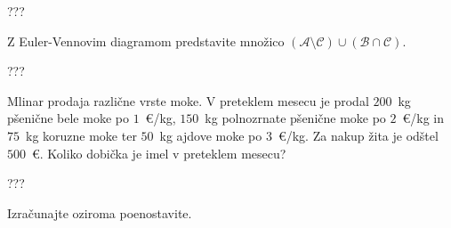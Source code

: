 \documentclass[addpoints,12pt]{exam}
\begin{document}
\begin{questions}
    \begin{solution}[8cm]
        ???
            \end{solution}




    \newpage
    \question[2]
    Z Euler-Vennovim diagramom predstavite množico $(\mathcal{A}\setminus\mathcal{C})\cup(\mathcal{B}\cap\mathcal{C})$.
    
    \begin{solution}[6cm]
        ???
            \end{solution}
        
    \question[3]
    Mlinar prodaja različne vrste moke. V preteklem mesecu je prodal $200$~kg pšenične bele moke po $1$~\euro/kg, $150$~kg polnozrnate pšenične moke po $2$~\euro/kg in 
    $75$~kg koruzne moke ter $50$~kg ajdove moke po $3$~\euro/kg. Za nakup žita je odštel $500$~\euro. Koliko dobička je imel v preteklem mesecu?

    \begin{solution}[5cm]
        ???
            \end{solution}

\newpage
    \question
    Izračunajte oziroma poenostavite.

    

\end{questions}
\end{document}
